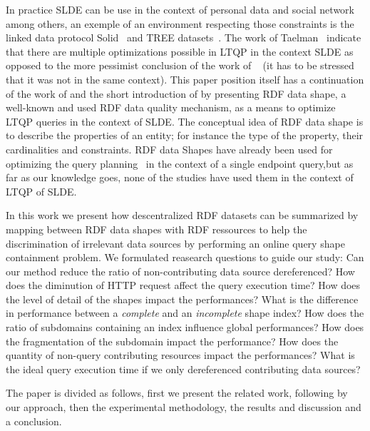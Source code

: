 In practice SLDE can be use in the context of personal data and social network among others,
an exemple of an environment respecting those constraints is the linked data protocol Solid~\cite{Taelman2023} and TREE datasets~\cite{tam_iswc_traversalsensortree_2024}.
The work of Taelman~\cite{Taelman2023} indicate that there are multiple optimizations possible in LTQP in the context SLDE as opposed to the
more pessimist conclusion of the work of ~\citeauthor{hartig2016walking} (it has to be stressed that it was not in the same context).
This paper position itself has a continuation of the work of \citeauthor{Taelman2023} and the short introduction of \citeauthor{tam2024opportunitiesshapebasedoptimizationlink} 
by presenting RDF data shape, a well-known and used RDF data quality mechanism, as a means to optimize LTQP queries in the context of SLDE.
The conceptual idea of RDF data shape is to describe the properties of an entity;
for instance the type of the property, their cardinalities and constraints.
RDF data Shapes have already been used for optimizing the query planning~\cite{kashif2021}
in the context of a single endpoint query,but as far as our knowledge goes, none of the studies have used them in the context of LTQP of SLDE.

In this work we present how descentralized RDF datasets can be summarized by mapping between RDF data shapes with RDF ressources 
to help the discrimination of irrelevant data sources by performing an online query shape containment problem.
We formulated reasearch questions to guide our study:
Can our method reduce the ratio of non-contributing data source dereferenced?
How does the diminution of HTTP request affect the query execution time?
How does the level of detail of the shapes impact the performances?
What is the difference in performance between a \emph{complete} and an \emph{incomplete} shape index?
How does the ratio of subdomains containing an index influence global performances?
How does the fragmentation of the subdomain impact the performance?
How does the quantity of non-query contributing resources impact the performances?
What is the ideal query execution time if we only dereferenced contributing data sources?

The paper is divided as follows, first we present the related work, following by our approach, then the
experimental methodology, the results and discussion and a conclusion.